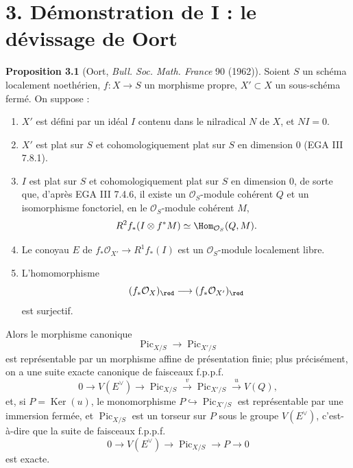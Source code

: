 \documentclass[11pt]{article}
\providecommand{\Pic}{\operatorname{Pic}}
\providecommand{\Ker}{\operatorname{Ker}}
\begin{document}
\section*{3. Démonstration de I : le dévissage de Oort}

\textbf{Proposition 3.1} (Oort, \emph{Bull. Soc. Math. France} 90 (1962)). Soient \(S\) un schéma localement noethérien, \(f:X\to S\) un morphisme propre, \(X'\subset X\) un sous-schéma fermé. On suppose :
\begin{enumerate}[label=\roman*)]
\item \(X'\) est défini par un idéal \(I\) contenu dans le nilradical \(N\) de \(X\), et \(NI=0\).
\item \(X'\) est plat sur \(S\) et cohomologiquement plat sur \(S\) en dimension \(0\) (EGA III 7.8.1).
\item \(I\) est plat sur \(S\) et cohomologiquement plat sur \(S\) en dimension \(0\), de sorte que, d'après EGA III 7.4.6, il existe un \(\mathcal O_S\)-module cohérent \(Q\) et un isomorphisme fonctoriel, en le \(\mathcal O_S\)-module cohérent \(M\),
\[
  R^2f_*(I\otimes f^*M)\simeq \Hom_{\mathcal O_S}(Q,M).
\]
\item Le conoyau \(E\) de \(f_*\mathcal O_{X'}\to R^1f_*(I)\) est un \(\mathcal O_S\)-module localement libre.
\item L'homomorphisme
\[
  (f_*\mathcal O_X)_{\red}\longrightarrow (f_*\mathcal O_{X'})_{\red}
\]
est surjectif.
\end{enumerate}
Alors le morphisme canonique
\[
  \Pic_{X/S}\longrightarrow \Pic_{X'/S}
\]
est représentable par un morphisme affine de présentation finie; plus précisément, on a une suite exacte canonique de faisceaux f.p.p.f.
\[
  0\longrightarrow V(E^\vee)\longrightarrow \Pic_{X/S}
  \xrightarrow{v}\Pic_{X'/S}\xrightarrow{u}V(Q),
\]
et, si \(P=\Ker(u)\), le monomorphisme \(P\hookrightarrow\Pic_{X'/S}\) est représentable par une immersion fermée, et \(\Pic_{X/S}\) est un torseur sur \(P\) sous le groupe \(V(E^\vee)\), c'est-à-dire que la suite de faisceaux f.p.p.f.
\[
  0\longrightarrow V(E^\vee)\longrightarrow \Pic_{X/S}\longrightarrow P\longrightarrow0
\]
est exacte.
\end{document}
